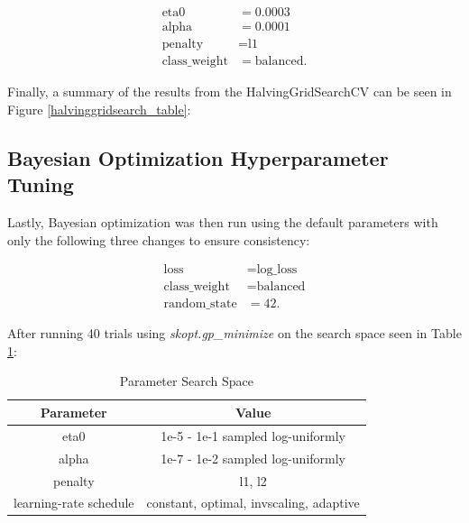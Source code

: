 \[
\begin{aligned}
\text{eta0} &= 0.0003 \\
\text{alpha} &= 0.0001 \\
\text{penalty} &= \text{l1} \\
\text{class\_weight} &= \text{balanced}.
\end{aligned}
\]

Finally, a summary of the results from the HalvingGridSearchCV can be seen in Figure \ref{halvinggridsearch_table}:

\begin{table}[htbp]
\caption{HalvingGridSearchCV Results}
\centering
{}
\label{halvinggridsearch_table}
\end{table}

\subsection{Bayesian Optimization Hyperparameter Tuning}\label{bayesian_section}

Lastly, Bayesian optimization was then run using the default parameters with only the following three changes to ensure consistency:

\[
\begin{aligned}
\text{loss} &= \text{log\_loss} \\
\text{class\_weight} &= \text{balanced} \\
\text{random\_state} &= 42.
\end{aligned}
\]

After running 40 trials using \emph{skopt.gp\_minimize} on the search space seen in Table \ref{bayesian_parameter_searchspace}:

\begin{table}[htbp]
\caption{Parameter Search Space}
\centering
    \begin{tabular}{|c|c|}
    \hline
    Parameter & Value \\
    \hline
    eta0 & 1e-5 - 1e-1 sampled log-uniformly \\
    alpha & 1e-7 - 1e-2 sampled log-uniformly \\
    penalty & {l1, l2} \\
    learning-rate schedule & {constant, optimal, invscaling, adaptive} \\
    \hline
    \end{tabular}
\label{bayesian_parameter_searchspace}
\end{table}

